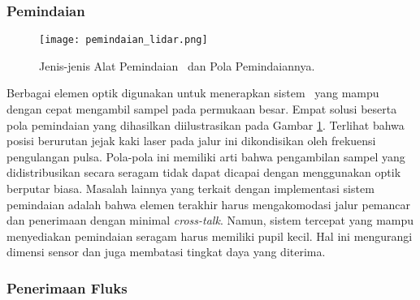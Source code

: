 \subsubsection{Pemindaian}
\label{subsec: Scanning}
    \begin{figure}[H]
        \centering
        \texttt{[image: pemindaian\_lidar.png]}
        \caption{Jenis-jenis Alat Pemindaian \lidar\ dan Pola Pemindaiannya\cite{bs9}.}
        \label{fig:Ch02_pemindaian_lidar}
    \end{figure}

    Berbagai elemen optik digunakan untuk menerapkan sistem \lidar\ yang mampu dengan cepat mengambil sampel pada permukaan besar. Empat solusi beserta pola pemindaian yang dihasilkan diilustrasikan pada Gambar \ref*{fig:Ch02_pemindaian_lidar}. Terlihat bahwa posisi berurutan jejak kaki laser pada jalur ini dikondisikan oleh frekuensi pengulangan pulsa. Pola-pola ini memiliki arti bahwa pengambilan sampel yang didistribusikan secara seragam tidak dapat dicapai dengan menggunakan optik berputar biasa. 
    Masalah lainnya yang terkait dengan implementasi sistem pemindaian adalah bahwa elemen terakhir harus mengakomodasi jalur pemancar dan penerimaan dengan minimal \textit{cross-talk}. Namun, sistem tercepat yang mampu menyediakan pemindaian seragam harus memiliki pupil kecil. Hal ini mengurangi dimensi sensor dan juga membatasi tingkat daya yang diterima.

\subsubsection{Penerimaan Fluks}
\label{subsec: receiving}


